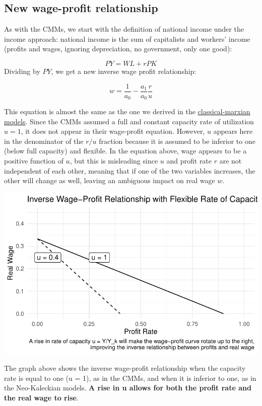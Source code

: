 \documentclass[
  letterpaper,
  DIV=11,
  numbers=noendperiod]{scrreprt}
\begin{document}
\hypertarget{new-wage-profit-relationship}{%
\subsection{New wage-profit
relationship}\label{new-wage-profit-relationship}}

As with the CMMs, we start with the definition of national income under
the income approach: national income is the sum of capitalists and
workers' income (profits and wages, ignoring depreciation, no
government, only one good):

\[PY = WL + rPK\] Dividing by \(PY\), we get a new inverse wage profit
relationship:

\[w = \frac{1}{a_0} - \frac{a_1}{a_0} \frac{r}{u}\]

This equation is almost the same as the one we derived in the
\href{https://jeylal.github.io/myblog/economics_series/classical-marxian\%20model/classical-marxian\%20model.html\#basis-of-the-model}{classical-marxian
models}. Since the CMMs assumed a full and constant capacity rate of
utilization \(u = 1\), it does not appear in their wage-profit equation.
However, \(u\) appears here in the denominator of the \(r/u\) fraction
because it is assumed to be inferior to one (below full capacity) and
flexible. In the equation above, wage appears to be a positive function
of \(u\), but this is misleading since \(u\) and profit rate \(r\) are
not independent of each other, meaning that if one of the two variables
increases, the other will change as well, leaving an ambiguous impact on
real wage \(w\).

\includegraphics{neo-kaleckian-models_files/figure-pdf/unnamed-chunk-2-1.pdf}

The graph above shows the inverse wage-profit relationship when the
capacity rate is equal to one (u = 1), as in the CMMs, and when it is
inferior to one, as in the Neo-Kaleckian models. \textbf{A rise in u
allows for both the profit rate and the real wage to rise}.
\end{document}
